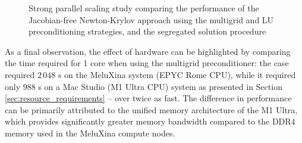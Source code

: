 \documentclass[sn-mathphys,Numbered]{sn-jnl}%
\begin{document}
\begin{figure}[htbp]
	\centering
	\caption{Strong parallel scaling study comparing the performance of the Jacobian-free Newton-Krylov approach using the multigrid and LU preconditioning strategies, and the segregated solution procedure}
	\label{fig:parallelisation_strong}
\end{figure}

As a final observation, the effect of hardware can be highlighted by comparing the time required for 1 core when using the multigrid preconditioner: the case required $2\,048$ s on the MeluXina system (EPYC Rome CPU), while it required only $988$ s on a Mac Studio (M1 Ultra CPU) system as presented in Section \ref{sec:resource_requirements} -- over twice as fast.
The difference in performance can be primarily attributed to the unified memory architecture of the M1 Ultra, which provides significantly greater memory bandwidth compared to the DDR4 memory used in the MeluXina compute nodes.

\end{document}

